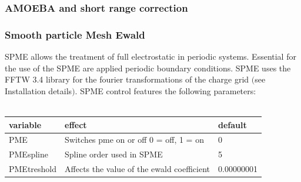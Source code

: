 \documentclass[10pt,a4paper]{article} %
\newif\ifdevmode %
\begin{document}
		\subsubsection{AMOEBA and short range correction}
		\ifdevmode \colorbox{red}{Blalala yaddayaddayadda… insert stuff here.} \fi
		\subsubsection{Smooth particle Mesh Ewald}
		\ac{SPME}\supercite{spme} allows the treatment of full electrostatic in periodic systems. Essential for the use of the \ac{SPME} are applied periodic boundary conditions. \ac{SPME} uses the FFTW 3.4 library for the fourier transformations of the charge grid $($see Installation details$)$.  \ac{SPME} control features the following parameters:\\~\\

		\begin{tabularx}{\textwidth}{l|l|l}
			variable & effect & default \\
			\hline
			PME & Switches pme on or off 0 = off, 1 = on & 0 \\
			PMEspline & Spline order used in SPME & 5 \\
			PMEtreshold & Affects the value of the ewald coefficient & 0.00000001 \\
		\end{tabularx}

		\ifdevmode
		\colorbox{red}{WE NEED TO ADRESS THE FFTW LIB ISSUE!}
		\fi

\end{document}
